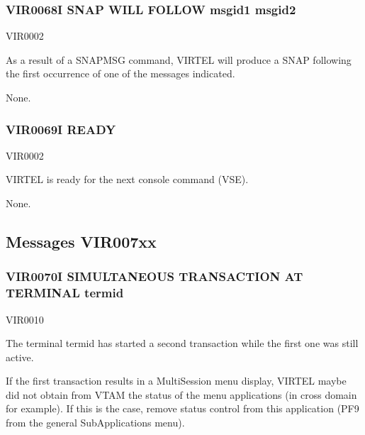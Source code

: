 \documentclass[letterpaper,10pt,english]{sphinxmanual}
\begin{document}
\subsubsection{VIR0068I SNAP WILL FOLLOW msgid1 msgid2}
\label{\detokenize{messages:vir0068i-snap-will-follow-msgid1-msgid2}}\begin{description}
\sphinxAtStartPar
VIR0002

\sphinxAtStartPar
As a result of a SNAPMSG command, VIRTEL will produce a SNAP following the first occurrence of one of the messages indicated.

\sphinxAtStartPar
None.

\end{description}


\subsubsection{VIR0069I READY}
\label{\detokenize{messages:vir0069i-ready}}\begin{description}
\sphinxAtStartPar
VIR0002

\sphinxAtStartPar
VIRTEL is ready for the next console command (VSE).

\sphinxAtStartPar
None.

\end{description}


\subsection{Messages VIR007xx}
\label{\detokenize{messages:messages-vir007xx}}

\subsubsection{VIR0070I SIMULTANEOUS TRANSACTION AT TERMINAL termid}
\label{\detokenize{messages:vir0070i-simultaneous-transaction-at-terminal-termid}}\begin{description}
\sphinxAtStartPar
VIR0010

\sphinxAtStartPar
The terminal termid has started a second transaction while the first one was still active.

\sphinxAtStartPar
If the first transaction results in a Multi\sphinxhyphen{}Session menu display, VIRTEL maybe did not obtain from VTAM the status of the menu applications (in cross domain for example). If this is the case, remove status control from this application (PF9 from the general Sub\sphinxhyphen{}Applications menu).

\end{description}
\end{document}
